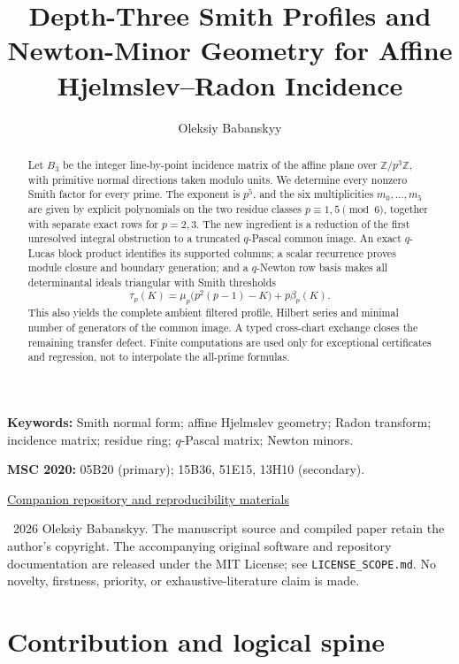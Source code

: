 \documentclass[12pt,a4paper]{article}
\title{Depth-Three Smith Profiles and Newton-Minor Geometry for Affine
  Hjelmslev--Radon Incidence}
\author{Oleksiy Babanskyy}
\date{}
\theoremstyle{definition}
\newcommand{\Z}{\mathbb Z}
\begin{document}
\raggedbottom
\maketitle

\begin{abstract}
Let $B_3$ be the integer line-by-point incidence matrix of the affine plane
over $\Z/p^3\Z$, with primitive normal directions taken modulo units.  We
determine every nonzero Smith factor for every prime.  The exponent is
$p^5$, and the six multiplicities $m_0,\ldots,m_5$ are given by explicit
polynomials on the two residue classes $p\equiv1,5\pmod6$, together with
separate exact rows for $p=2,3$.  The new ingredient is a reduction of the
first unresolved integral obstruction to a truncated $q$-Pascal common
image.  An exact $q$-Lucas block product identifies its supported columns;
a scalar recurrence proves module closure and boundary generation; and a
$q$-Newton row basis makes all determinantal ideals triangular with Smith
thresholds
\[
 \tau_p(K)=\mu_p\bigl(p^2(p-1)-K\bigr)+p\beta_p(K).
\]
This also yields the complete ambient filtered profile, Hilbert series and
minimal number of generators of the common image.  A typed cross-chart
exchange closes the remaining transfer defect.  Finite computations are
used only for exceptional certificates and regression, not to interpolate
the all-prime formulas.
\end{abstract}

\smallskip
\noindent\textbf{Keywords:} Smith normal form; affine Hjelmslev geometry;
Radon transform; incidence matrix; residue ring; $q$-Pascal matrix; Newton
minors.

\smallskip
\noindent\textbf{MSC 2020:} 05B20 (primary); 15B36, 51E15, 13H10
(secondary).

\begin{center}
\small
\href{https://github.com/aconsciousfractal/FCIG-Depth-Three-Smith-Profiles-and-Newton-Minor-Geometry-for-Affine-Hjelmslev-Radon-Incidence}{Companion repository and reproducibility materials}
\end{center}

\smallskip
\noindent\textcopyright\ 2026 Oleksiy Babanskyy.  The manuscript source
and compiled paper retain the author's copyright.  The accompanying original
software and repository documentation are released under the MIT License;
see \texttt{LICENSE\_SCOPE.md}.  No novelty, firstness, priority, or
exhaustive-literature claim is made.

\section{Contribution and logical spine}
\label{sec:contribution}
\end{document}
